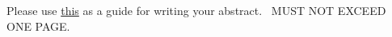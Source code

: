 
\begin{abstractwithpageno}	
    Please use \href{https://writingcenter.gmu.edu/writing-resources/different-genres/writing-an-abstract}{this} as a guide for writing your abstract. \lipsum[4]\ MUST NOT EXCEED ONE PAGE.
\end{abstractwithpageno}